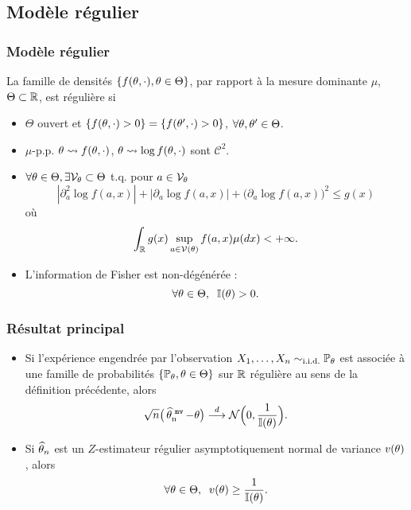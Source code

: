 \subsection{Modèle régulier}

\begin{frame}
\frametitle{Modèle régulier}
\begin{df} La famille de densités $\{f(\theta,\cdot),\theta \in \Theta\}$,  par rapport à la mesure dominante $\mu$, $\Theta \subset \operatorname{{\mathbb R}}$, est \alert{régulière} si
\begin{itemize}
\item $\Theta$ ouvert et $\{f(\theta, \cdot)>0\}=\{f(\theta', \cdot)>0\}$, $\forall \theta, \theta' \in \Theta$.
\item $\mu$-p.p. $\theta \leadsto f(\theta,\cdot)$, $\theta \leadsto \log f(\theta,\cdot)$ sont ${\mathcal C}^2$.
 \item $\forall \theta \in \Theta, \exists {\mathcal V}_\theta \subset \Theta$ t.q. pour $a \in {\mathcal V}_\theta$
$$|\partial_a^{2}\log f(a,x)|+|\partial_a \log f(a,x)|+\big(\partial_a\log f(a,x)\big)^2\leq g(x)$$
où
$$\int_{\mathbb{R}}g(x)\sup_{a \in {\mathcal V}(\theta)}f(a,x)\mu(dx)<+\infty.$$
\item L'information de Fisher est non-dégénérée :
$$\forall \theta \in \Theta,\;\;\mathbb{I}(\theta) >0.$$
\end{itemize}
\end{df}
\end{frame}

\begin{frame}
\frametitle{Résultat principal}
\begin{prop}
\begin{itemize}
\item Si l'expérience engendrée par l'observation $X_1,\ldots, X_n\sim_{\text{i.i.d.}}\operatorname{{\mathbb P}}_\theta$ est associée à une famille de probabilités $\{\operatorname{{\mathbb P}}_\theta, \theta \in \Theta\}$ sur $\operatorname{{\mathbb R}}$ \alert{ régulière} au sens de la définition précédente, alors
$$\sqrt{n}\big(\operatorname{\widehat \theta_n^{\,\,{\tt mv}}}-\theta\big) \stackrel{d}{\longrightarrow} {\mathcal N}\Big(0,\frac{1}{\mathbb{I}(\theta)}\Big).$$
\item Si $\operatorname{\widehat \theta_{\mathnormal{n}}}$ est un $Z$-estimateur \alert{régulier} asymptotiquement normal de variance $v(\theta)$, alors
$$\forall \theta \in \Theta,\;\;v(\theta) \geq \frac{1}{\mathbb{I}(\theta)}.$$
\end{itemize}
\end{prop}
\end{frame}

